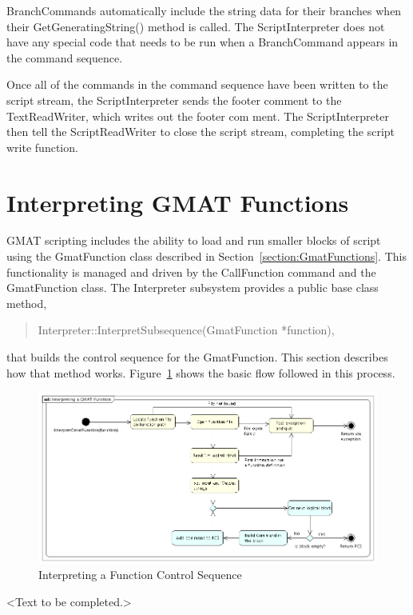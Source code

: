 BranchCommands automatically include the string data for their branches when their
GetGeneratingString() method is called.  The ScriptInterpreter does not have any special code that
needs to be run when a BranchCommand appears in the command sequence.

Once all of the commands in the command sequence have been written to the script stream, the
ScriptInterpreter sends the footer comment to the TextReadWriter, which writes out the footer com
ment.  The ScriptInterpreter then tell the ScriptReadWriter to close the script stream, completing
the script write function.


\section{\label{section:InterpretingGmatFunctions}Interpreting GMAT Functions}

GMAT scripting includes the ability to load and run smaller blocks of script using the GmatFunction
class described in Section~\ref{section:GmatFunctions}.  This functionality is managed and driven
by the CallFunction command and the GmatFunction class.  The Interpreter subsystem provides a
public base class method,
\begin{quote}
Interpreter::InterpretSubsequence(GmatFunction *function),
\end{quote}
\noindent that builds the control sequence for the GmatFunction.  This section describes how that
method works.  Figure~\ref{figure:InterpretGmatFunction} shows the basic flow followed in this
process.

\begin{figure}[htb]
\begin{center}
\includegraphics[454,230]{Images/InterpretingaGMATFunction.png}
\caption{\label{figure:InterpretGmatFunction}Interpreting a Function Control Sequence}
\end{center}
\end{figure}


<Text to be completed.>